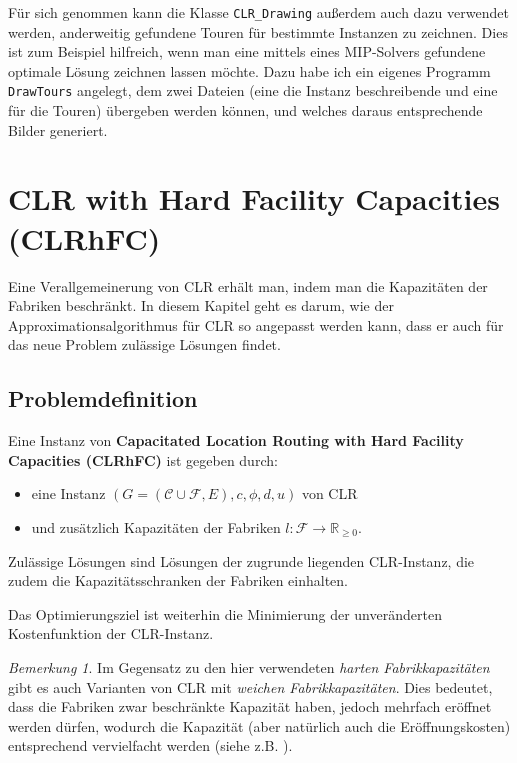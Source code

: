 \documentclass[a4paper,ngerman,11pt,bibtotoc]{scrartcl}
\theoremstyle{definition}
\theoremstyle{plain}
\theoremstyle{remark}
\newtheorem{bem}[defn]{Bemerkung}
\newcommand{\IR}{\mathbb{R}}
\newcommand{\ClientSet}{\mathscr{C}}
\newcommand{\FacilitySet}{\mathscr{F}}
\newcommand{\CLR}{CLR}
\newcommand{\CLRHFC}{CLRhFC}
\begin{document}
Für sich genommen kann die Klasse \lstinline|CLR_Drawing| außerdem auch dazu verwendet werden, anderweitig gefundene Touren für bestimmte Instanzen zu zeichnen. Dies ist zum Beispiel hilfreich, wenn man eine mittels eines MIP-Solvers gefundene optimale Lösung zeichnen lassen möchte. Dazu habe ich ein eigenes Programm \lstinline|DrawTours| angelegt, dem zwei Dateien (eine die Instanz beschreibende und eine für die Touren) übergeben werden können, und welches daraus entsprechende Bilder generiert.


\section{\CLR{} with Hard Facility Capacities (\CLRHFC)}

Eine Verallgemeinerung von \CLR{} erhält man, indem man die Kapazitäten der Fabriken beschränkt. In diesem Kapitel geht es darum, wie der Approximationsalgorithmus für \CLR{} so angepasst werden kann, dass er auch für das neue Problem zulässige Lösungen findet.

	\subsection{Problemdefinition}\label{sec:CLRHFC-Def}

Eine Instanz von \textbf{Capacitated Location Routing with Hard Facility Capacities (\CLRHFC)} ist gegeben durch:
\begin{itemize}
	\item eine Instanz $(G=(\ClientSet\cup\FacilitySet,E), c,\phi,d,u)$ von \CLR
	\item und zusätzlich Kapazitäten der Fabriken $l: \FacilitySet \to \IR_{\geq 0}$.
\end{itemize}
Zulässige Lösungen sind Lösungen der zugrunde liegenden \CLR-Instanz, die zudem die Kapazitätsschranken der Fabriken einhalten.

Das Optimierungsziel ist weiterhin die Minimierung der unveränderten Kostenfunktion der \CLR-Instanz.

\begin{bem}
Im Gegensatz zu den hier verwendeten \emph{harten Fabrikkapazitäten} gibt es auch Varianten von \CLR{} mit \emph{weichen Fabrikkapazitäten}. Dies bedeutet, dass die Fabriken zwar beschränkte Kapazität haben, jedoch mehrfach eröffnet werden dürfen, wodurch die Kapazität (aber natürlich auch die Eröffnungskosten) entsprechend vervielfacht werden (siehe z.B. \cite{SoftCap1}).  
\end{bem}
\end{document}
